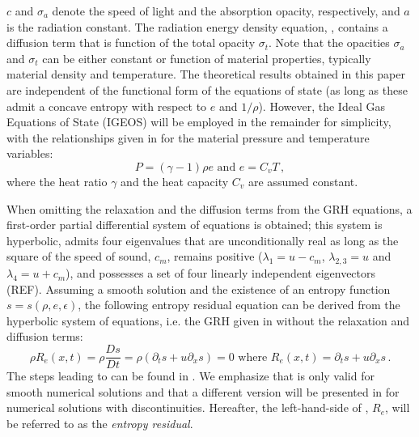 \documentclass[times]{fldauth}
\begin{document}
$c$ and $\sigma_a$ denote the speed of light and the absorption opacity, respectively, and $a$ is the radiation 
constant. The radiation energy density equation, , contains a diffusion term that is function of the 
total opacity $\sigma_t$. Note that the opacities $\sigma_a$ and $\sigma_t$ can be either constant or function of 
material properties, typically material density and temperature. 
The theoretical results obtained in this paper are independent of the functional form of the equations of state 
(as long as these admit a concave entropy with respect to $e$ and $1/ \rho$). However, the Ideal Gas Equations of State
(IGEOS) will be employed in the remainder for simplicity, with the relationships given in  for the material pressure and temperature variables:
%
\begin{equation}\label{eq:IGEOS}
P = (\gamma-1) \rho e \text{  and  } e = C_v T \, ,
\end{equation}
%
where the heat ratio $\gamma$ and the heat capacity $C_v$ are assumed constant.

When omitting the relaxation and the diffusion terms from the GRH equations, a first-order partial differential system 
of equations is obtained; this system is hyperbolic, admits four eigenvalues that are unconditionally real as long as the square of the speed of sound, $c_m$, remains positive ($\lambda_1 = u - c_m$, $\lambda_{2,3} = u$ and  $\lambda_4 = u + c_m$), and possesses a set of four linearly independent eigenvectors (REF).  
 
Assuming a smooth solution and the existence of an entropy function $s=s(\rho, e, \epsilon)$, the following entropy residual equation can be derived from the hyperbolic system of equations, i.e. the GRH given in  without the relaxation and diffusion terms:
 
%
\begin{equation}\label{eq:GRH-entropy}
\rho R_e(x,t) = \rho \frac{D s}{Dt}  =\rho  \left( \partial_t s + u \partial_x s \right) = 0 \text{ where } R_e(x,t) = \partial_t s + u \partial_x s \, .
\end{equation}
%
The steps leading to  
can be found in \cite{our_jcp_radhy_paper}.
We emphasize that  is only valid for smooth numerical solutions and that a different version 
will be presented in  for numerical solutions with discontinuities. 
Hereafter, the left-hand-side of , $R_e$, will be referred to as the \emph{entropy residual}.
\end{document}
